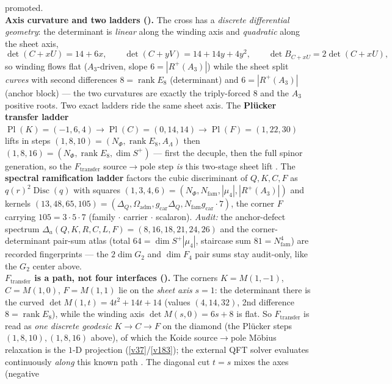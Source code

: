 \documentclass[11pt,a4paper]{article}
\newcommand{\gcar}{g_{\mathrm{car}}}
\newcommand{\Nfam}{N_{\mathrm{fam}}}
\theoremstyle{definition}
\begin{document}
\begin{winbox}
promoted.
\smallskip\\
\noindent\textbf{Axis curvature and two ladders ().} The cross has a
\emph{discrete differential geometry}: the determinant is \emph{linear} along the winding axis and
\emph{quadratic} along the sheet axis,
\[
  \det(C{+}xU)=14+6x,\qquad \det(C{+}yV)=14+14y+4y^2,\qquad \det B_{C+xU}=2\det(C{+}xU),
\]
so winding flows flat ($A_3$-driven, slope $6=|R^+(A_3)|$) while the sheet split \emph{curves} with second
differences $8=\operatorname{rank}E_8$ (determinant) and $6=|R^+(A_3)|$ (anchor block) --- the two curvatures
are exactly the triply-forced $8$ and the $A_3$ positive roots. Two exact ladders ride the same sheet axis.
The \textbf{Pl\"ucker transfer ladder} $\operatorname{Pl}(K)=({-}1,6,4)\to\operatorname{Pl}(C)=(0,14,14)\to
\operatorname{Pl}(F)=(1,22,30)$ lifts in steps $(1,8,10)=(N_\Phi,\operatorname{rank}E_8,A_\Lambda)$ then
$(1,8,16)=(N_\Phi,\operatorname{rank}E_8,\dim S^+)$ --- first the decuple, then the full spinor generation, so
the $F_{\mathrm{transfer}}$ source$\to$pole step \emph{is} this two-stage sheet lift \mC. The \textbf{spectral
ramification ladder} factors the cubic discriminant of $Q,K,C,F$ as $q(r)^2\operatorname{Disc}(q)$ with squares
$(1,3,4,6)=(N_\Phi,\Nfam,|\mu_4|,|R^+(A_3)|)$ and kernels $(13,48,65,105)=(\Delta_Q,\Omega_{\mathrm{adm}},
\gcar\Delta_Q,\Nfam\gcar\cdot7)$, the corner $F$ carrying $105=3{\cdot}5{\cdot}7$ (family $\cdot$ carrier
$\cdot$ scalaron). \emph{Audit:} the anchor-defect spectrum $\Delta_a(Q,K,R,C,L,F)=(8,16,18,21,24,26)$ and the
corner-determinant pair-sum atlas (total $64=\dim S^+|\mu_4|$, staircase sum $81=\Nfam^4$) are recorded
fingerprints --- the $2\dim G_2$ and $\dim F_4$ pair sums stay audit-only, like the $G_2$ center above.
\smallskip\\
\noindent\textbf{$F_{\mathrm{transfer}}$ is a path, not four interfaces ().}
The corners $K{=}M(1,{-}1)$, $C{=}M(1,0)$, $F{=}M(1,1)$ lie on the \emph{sheet axis} $s{=}1$: the determinant
there is the curved $\det M(1,t)=4t^2{+}14t{+}14$ (values $(4,14,32)$, 2nd difference $8{=}\operatorname{rank}E_8$),
while the winding axis $\det M(s,0)=6s{+}8$ is flat. So $F_{\mathrm{transfer}}$ is read as \emph{one discrete
geodesic} $K\to C\to F$ on the diamond (the Pl\"ucker steps $(1,8,10),(1,8,16)$ above), of which the Koide
source$\to$pole M\"obius relaxation is the $1$-D projection (\vref{v37}/\vref{v183}); the external QFT solver
evaluates continuously \emph{along} this known path \mC. The diagonal cut $t{=}s$ mixes the axes (negative

\end{winbox}
\end{document}
